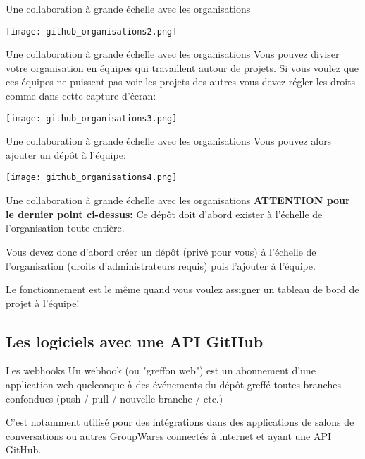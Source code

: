 \documentclass{beamer}
\begin{document}
\begin{frame}{Une collaboration à grande échelle avec les organisations}
\begin{center}
	\texttt{[image: github\_organisations2.png]}
\end{center}
\end{frame}

\begin{frame}{Une collaboration à grande échelle avec les organisations}
Vous pouvez diviser votre organisation en équipes qui travaillent autour de projets. Si vous voulez que ces équipes ne puissent pas voir les projets des autres vous devez régler les droits comme dans cette capture d'écran:
\medskip
\begin{center}
	\texttt{[image: github\_organisations3.png]}
\end{center}
\end{frame}

\begin{frame}{Une collaboration à grande échelle avec les organisations}
Vous pouvez alors ajouter un dépôt à l'équipe:
\medskip
\begin{center}
	\texttt{[image: github\_organisations4.png]}
\end{center}
\end{frame}

\begin{frame}{Une collaboration à grande échelle avec les organisations}
\textbf{ATTENTION pour le dernier point ci-dessus:} Ce dépôt doit d'abord exister à l'échelle de l'organisation toute entière.\\
\medskip

Vous devez donc d'abord créer un dépôt (privé pour vous) à l'échelle de l'organisation (droits d'administrateurs requis) puis l'ajouter à l'équipe.\\
\medskip

Le fonctionnement est le même quand vous voulez assigner un tableau de bord de projet à l'équipe!
\end{frame}


\subsection{Les logiciels avec une API GitHub}
\begin{frame}{Les webhooks}
Un webhook (ou "greffon web") est un abonnement d'une application web quelconque à des événements du dépôt greffé toutes branches confondues (push / pull / nouvelle branche / etc.)\\
\medskip

C'est notamment utilisé pour des intégrations dans des applications de salons de conversations ou autres GroupWares connectés à internet et ayant une API GitHub.
\end{frame}
\end{document}
